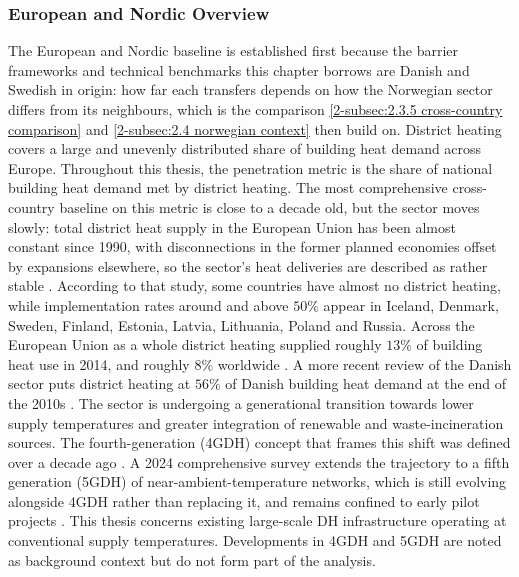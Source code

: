 \subsubsection{European and Nordic Overview}
\label{2-subsec:2.2.1 eu and nordic overview}

The European and Nordic baseline is established first because the barrier frameworks and technical benchmarks this chapter borrows are Danish and Swedish in origin: how far each transfers depends on how the Norwegian sector differs from its neighbours, which is the comparison \autoref{2-subsec:2.3.5 cross-country comparison} and \autoref{2-subsec:2.4 norwegian context} then build on. District heating covers a large and unevenly distributed share of building heat demand across Europe. Throughout this thesis, the penetration metric is the share of national building heat demand met by district heating. The most comprehensive cross-country baseline on this metric is close to a decade old, but the sector moves slowly: total district heat supply in the European Union has been almost constant since 1990, with disconnections in the former planned economies offset by expansions elsewhere, so the sector's heat deliveries are described as rather stable \cite{werner_international_2017}. According to that study, some countries have almost no district heating, while implementation rates around and above $50\%$ appear in Iceland, Denmark, Sweden, Finland, Estonia, Latvia, Lithuania, Poland and Russia. Across the European Union as a whole district heating supplied roughly $13\%$ of building heat use in 2014, and roughly $8\%$ worldwide \cite{werner_international_2017}. A more recent review of the Danish sector puts district heating at $56\%$ of Danish building heat demand at the end of the 2010s \cite{johansen_something_2022}. The sector is undergoing a generational transition towards lower supply temperatures and greater integration of renewable and waste-incineration sources. The fourth-generation (4GDH) concept that frames this shift was defined over a decade ago \cite{lund_4th_2014}. A 2024 comprehensive survey extends the trajectory to a fifth generation (5GDH) of near-ambient-temperature networks, which is still evolving alongside 4GDH rather than replacing it, and remains confined to early pilot projects \cite{dang_fifth_2024}. This thesis concerns existing large-scale DH infrastructure operating at conventional supply temperatures. Developments in 4GDH and 5GDH are noted as background context but do not form part of the analysis. 

